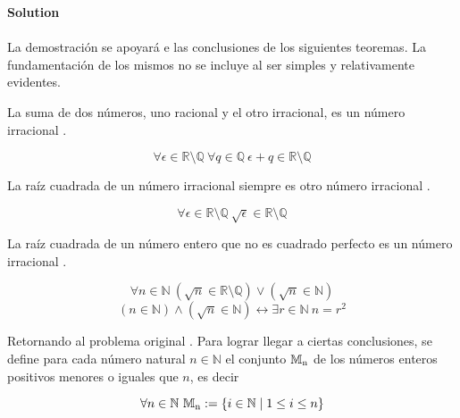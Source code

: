 \noindent\textbf{Solution } \\\\

La demostración se apoyará e las conclusiones de los siguientes teoremas. La fundamentación de los mismos no se incluye al ser simples y relativamente evidentes.

\begin{theorem} \label{irnum_sum_rational}
	La suma de dos números, uno racional y el otro irracional, es un número irracional .
	
	\begin{equation} \label{eq_irnum_sum_rational}
		\forall \epsilon \in \mathbb{R} \setminus \mathbb{Q}\ \forall q \in \mathbb{Q}\ \epsilon + q \in \mathbb{R} \setminus \mathbb{Q}
	\end{equation}
\end{theorem}

\begin{theorem} \label{irnum_closure_sqrt}
	La raíz cuadrada de un número irracional siempre es otro número irracional .
	
	\begin{equation} \label{eq_irnum_closure_sqrt}
		\forall \epsilon \in \mathbb{R} \setminus \mathbb{Q}\ \sqrt{\epsilon} \in \mathbb{R} \setminus \mathbb{Q}
	\end{equation}
\end{theorem}

\begin{theorem} \label{irnum_nat_sqrt}
	La raíz cuadrada de un número entero que no es cuadrado perfecto es un número irracional .
	
	\begin{equation} \label{eq_irnum_nat_sqrt}
		\forall n \in \mathbb{N}\ (\sqrt{n} \in \mathbb{R} \setminus \mathbb{Q}) \lor (\sqrt{n} \in \mathbb{N})
	\end{equation}
	\begin{equation}
		(n \in \mathbb{N}) \land (\sqrt{n} \in \mathbb{N}) \leftrightarrow \exists r \in \mathbb{N}\ n = r^{2}
	\end{equation}
\end{theorem}

Retornando al problema original . Para lograr llegar a ciertas conclusiones, se define para cada número natural $n \in \mathbb{N}$ el conjunto $\mathbb{M}\textsubscript{n}$ de los números enteros positivos menores o iguales que $n$, es decir 

\begin{equation} \label{eq_11_bmo200700003_1}
	\forall n \in \mathbb{N}\ \mathbb{M}\textsubscript{n} := \{i \in \mathbb{N} \mid 1 \leq i \leq n\}
\end{equation}

